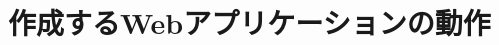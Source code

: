 \documentclass[main]{subfiles}
\begin{document}
\chapter{作成するWebアプリケーションの動作}
\label{cha:application_motion}
\end{document}
